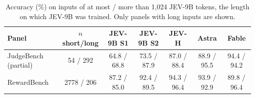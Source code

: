 \begin{table}[t]
\centering\small
\caption{Accuracy (\%) on inputs of at most / more than 1{,}024 JEV-9B tokens, the length on which JEV-9B was trained. Only panels with long inputs are shown.}
\label{tab:length}
\begin{tabular}{@{}lcccccc@{}}
\toprule
Panel & $n$ short/long & JEV-9B S1 & JEV-9B S2 & JEV-H & Astra & Fable \\
\midrule
JudgeBench (partial) & 54 / 292 & 64.8 / 68.8 & 73.5 / 87.9 & 87.0 / 88.4 & 88.9 / 95.5 & 94.4 / 94.2 \\
RewardBench & 2778 / 206 & 87.2 / 85.0 & 92.4 / 89.5 & 94.3 / 96.4 & 93.9 / 92.9 & 89.8 / 96.4 \\
\bottomrule
\end{tabular}
\end{table}
